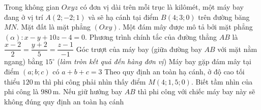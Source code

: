 \begin{ex}%
	Trong không gian $Oxyz$ có đơn vị dài trên mỗi trục là kilômét, một máy bay đang ở vị trí $A(2;-2;1)$ và sẽ hạ cánh tại điểm $B(4;3;0)$ trên đường băng $MN$. Mặt đất là mặt phẳng $(Oxy)$. Một đám mây được mô tả bởi mặt phẳng $(\alpha)\colon x-y+10z-4=0$.
	\choiceTF
	{\True Phương trình chính tắc của đường thẳng $AB$ là $\dfrac{x-2}{2} = \dfrac{y+2}{5} = \dfrac{z-1}{-1}$}
	{Góc trượt của máy bay (giữa đường bay $AB$ với mặt nằm ngang) bằng $15^\circ$ (\textit{làm tròn kết quả đến hàng đơn vị})}
	{Máy bay gặp đám mây tại điểm $(a;b;c)$ có $a+b+c=3$}
	{Theo quy định an toàn hạ cánh, ở độ cao tối thiểu $120$\,m thì phi công phải nhìn thấy điểm $M(4;1{,}5;0)$. Biết tầm nhìn của phi công là $980$\,m. Nếu giữ hướng bay $AB$ thì phi công với chiếc máy bay này sẽ không đúng quy định an toàn hạ cánh}
\end{ex}
